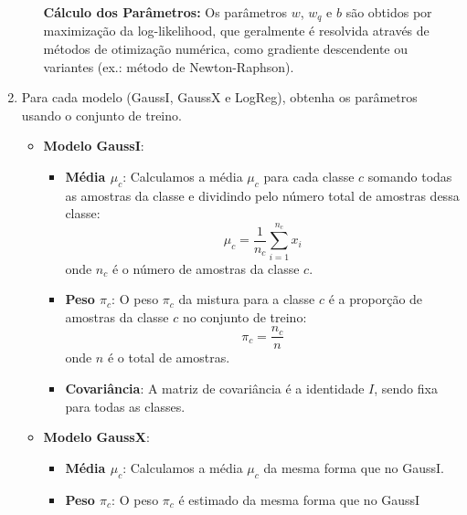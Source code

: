 \begin{enumerate}
\begin{tcolorbox}[title=Resposta (continuação):]
\begin{itemize}
            
                \textbf{Cálculo dos Parâmetros:}  
                Os parâmetros \( w \), \( w_q \) e \( b \) são obtidos por maximização da log-likelihood, que geralmente é resolvida através de métodos de otimização numérica, como gradiente descendente ou variantes (ex.: método de Newton-Raphson).
            
            \end{itemize}

        \end{tcolorbox}

        
    \item Para cada modelo (GaussI, GaussX e LogReg), obtenha os parâmetros usando o conjunto de treino.
    \begin{tcolorbox}[title=Resposta:]
        
        \begin{itemize}
            \item \textbf{Modelo GaussI}: 
            \begin{itemize}
                \item \textbf{Média \( \mu_c \)}: Calculamos a média \( \mu_c \) para cada classe \( c \) somando todas as amostras da classe e dividindo pelo número total de amostras dessa classe:
                \[
                \mu_c = \frac{1}{n_c} \sum_{i=1}^{n_c} x_i
                \]
                onde \( n_c \) é o número de amostras da classe \( c \).
                
                \item \textbf{Peso \( \pi_c \)}: O peso \( \pi_c \) da mistura para a classe \( c \) é a proporção de amostras da classe \( c \) no conjunto de treino:
                \[
                \pi_c = \frac{n_c}{n}
                \]
                onde \( n \) é o total de amostras.
                
                \item \textbf{Covariância}: A matriz de covariância é a identidade \( I \), sendo fixa para todas as classes.
            \end{itemize}
        
            \item \textbf{Modelo GaussX}: 
            \begin{itemize}
                \item \textbf{Média \( \mu_c \)}: Calculamos a média \( \mu_c \) da mesma forma que no GaussI.
                
                \item \textbf{Peso \( \pi_c \)}: O peso \( \pi_c \) é estimado da mesma forma que no GaussI
        

\end{itemize}
\end{itemize}
\end{tcolorbox}
\end{enumerate}
